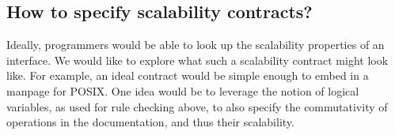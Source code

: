 \subsection{How to specify scalability contracts?}

Ideally, programmers would be able to look up the scalability properties
of an interface.  We would like to explore what such a scalability
contract might look like.  For example, an ideal contract would be simple
enough to embed in a manpage for POSIX\@.  One idea would be to leverage
the notion of logical variables, as used for rule checking above,
to also specify the commutativity of operations in the documentation,
and thus their scalability.
